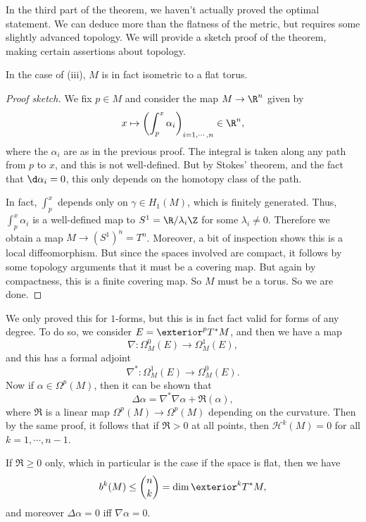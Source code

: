 \documentclass[a4paper]{article}
\begin{document}
In the third part of the theorem, we haven't actually proved the optimal statement. We can deduce more than the flatness of the metric, but requires some slightly advanced topology. We will provide a sketch proof of the theorem, making certain assertions about topology.

\begin{prop}
  In the case of (iii), $M$ is in fact isometric to a flat torus.
\end{prop}

\begin{proof}[Proof sketch] %
  We fix $p \in M$ and consider the map $M \to \R^n$ given by
  \[
    x \mapsto \left(\int_p^x \alpha_i\right)_{i = 1, \cdots, n} \in \R^n,
  \]
  where the $\alpha_i$ are as in the previous proof. The integral is taken along any path from $p$ to $x$, and this is not well-defined. But by Stokes' theorem, and the fact that $\d \alpha_i = 0$, this only depends on the homotopy class of the path.

  In fact, $\int_p^x$ depends only on $\gamma \in H_1(M)$, which is finitely generated. Thus, $\int_p^x \alpha_i$ is a well-defined map to $S^1 = \R/\lambda_i \Z$ for some $\lambda_i \not= 0$. Therefore we obtain a map $M \to (S^1)^n = T^n$. Moreover, a bit of inspection shows this is a local diffeomorphism. But since the spaces involved are compact, it follows by some topology arguments that it must be a covering map. But again by compactness, this is a finite covering map. So $M$ must be a torus. So we are done.
\end{proof}

We only proved this for $1$-forms, but this is in fact fact valid for forms of any degree. To do so, we consider $E = \exterior^p T^* M$, and then we have a map
\[
  \nabla: \Omega_M^0(E) \to \Omega_M^1(E),
\]
and this has a formal adjoint
\[
  \nabla^*: \Omega_M^1(E) \to \Omega_M^0(E).
\]
Now if $\alpha \in \Omega^p(M)$, then it can be shown that
\[
  \Delta \alpha = \nabla^* \nabla \alpha + \mathfrak{R}(\alpha),
\]
where $\mathfrak{R}$ is a linear map $\Omega^p(M) \to \Omega^p(M)$ depending on the curvature. Then by the same proof, it follows that if $\mathfrak{R} > 0$ at all points, then $\mathcal{H}^k(M) = 0$ for all $k = 1, \cdots, n - 1$.

If $\mathfrak{R} \geq 0$ only, which in particular is the case if the space is flat, then we have
\[
  b^k(M) \leq \binom{n}{k} = \dim \exterior^k T^* M,
\]
and moreover $\Delta \alpha = 0$ iff $\nabla \alpha = 0$.
\end{document}
